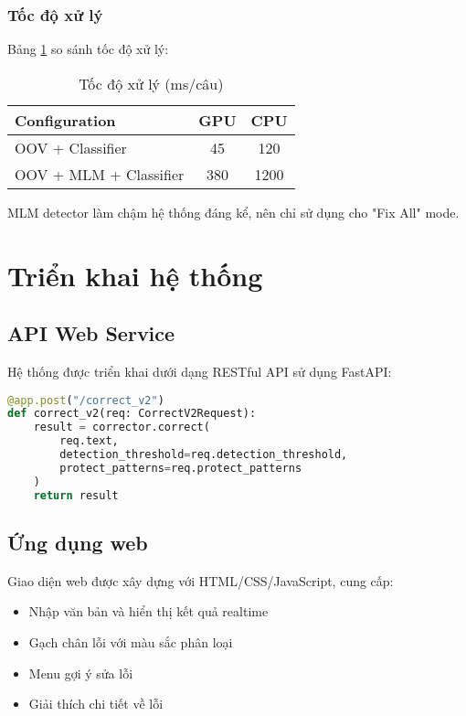 \documentclass[conference]{IEEEtran}
\begin{document}
\subsubsection{Tốc độ xử lý}
Bảng \ref{tab:speed} so sánh tốc độ xử lý:

\begin{table}[htbp]
\caption{Tốc độ xử lý (ms/câu)}
\label{tab:speed}
\centering
\begin{tabular}{|l|c|c|}
\hline
\textbf{Configuration} & \textbf{GPU} & \textbf{CPU} \\
\hline
OOV + Classifier & 45 & 120 \\
OOV + MLM + Classifier & 380 & 1200 \\
\hline
\end{tabular}
\end{table}

MLM detector làm chậm hệ thống đáng kể, nên chỉ sử dụng cho "Fix All" mode.

\section{Triển khai hệ thống}

\subsection{API Web Service}
Hệ thống được triển khai dưới dạng RESTful API sử dụng FastAPI:

\begin{lstlisting}[language=Python, caption=API endpoint example]
@app.post("/correct_v2")
def correct_v2(req: CorrectV2Request):
    result = corrector.correct(
        req.text,
        detection_threshold=req.detection_threshold,
        protect_patterns=req.protect_patterns
    )
    return result
\end{lstlisting}

\subsection{Ứng dụng web}
Giao diện web được xây dựng với HTML/CSS/JavaScript, cung cấp:
\begin{itemize}
    \item Nhập văn bản và hiển thị kết quả realtime
    \item Gạch chân lỗi với màu sắc phân loại
    \item Menu gợi ý sửa lỗi
    \item Giải thích chi tiết về lỗi
\end{itemize}
\end{document}
